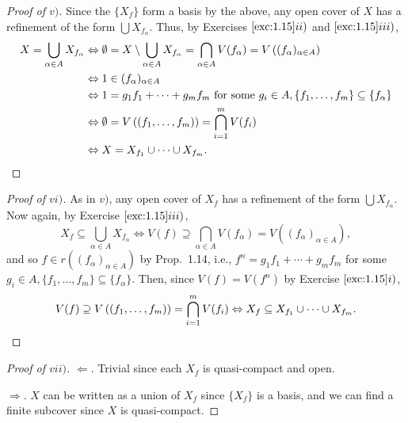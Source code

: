 \documentclass[12pt,letterpaper]{article}
\theoremstyle{definition}
\theoremstyle{remark}
\numberwithin{figure}{problem}
\numberwithin{equation}{section}
\begin{document}
\begin{proof}[Proof of $v)$]
  Since the $\{X_f\}$ form a basis by the above, any open cover of $X$ has a refinement of the form $\bigcup X_{f_\alpha}$. Thus, by Exercises $\ref{exc:1.15}ii)$ and $\ref{exc:1.15}iii)$,
  \begin{align*}
    X = \bigcup_{\alpha \in A} X_{f_\alpha} &\Leftrightarrow \emptyset = X \setminus \bigcup_{\alpha \in A} X_{f_\alpha} = \bigcap_{\alpha \in A} V(f_\alpha) = V\left( (f_\alpha)_{\alpha\in A} \right)\\
    &\Leftrightarrow 1 \in (f_\alpha)_{\alpha \in A}\\
    &\Leftrightarrow 1 = g_1f_1 + \cdots + g_mf_m\ \text{for some}\ g_i \in A, \{f_1,\ldots,f_m\} \subseteq \{f_\alpha\}\\
    &\Leftrightarrow \emptyset = V\left( (f_1,\ldots,f_{m}) \right) = \bigcap_{i=1}^m V(f_i)\\
    &\Leftrightarrow X = X_{f_1} \cup \cdots \cup X_{f_m}.\qedhere
  \end{align*}
\end{proof}
\begin{proof}[Proof of $vi)$]
  As in $v)$, any open cover of $X_f$ has a refinement of the form $\bigcup X_{f_\alpha}$. Now again, by Exercise $\ref{exc:1.15}iii)$,
  \begin{equation*}
    X_f \subseteq \bigcup_{\alpha \in A} X_{f_\alpha} \Leftrightarrow V(f) \supseteq \bigcap_{\alpha \in A} V(f_\alpha) = V\left( (f_\alpha)_{\alpha \in A} \right),
  \end{equation*}
  and so $f \in r\left( (f_\alpha)_{\alpha \in A} \right)$ by Prop.~1.14, i.e., $f^n = g_1f_1 + \cdots + g_mf_m$ for some $g_i \in A, \{f_1,\ldots,f_m\} \subseteq \{f_\alpha\}$. Then, since $V(f) = V(f^n)$ by Exercise $\ref{exc:1.15}i)$,
  \begin{equation*}
    V(f) \supseteq V\left( (f_1,\ldots,f_m) \right) = \bigcap_{i=1}^m V(f_i) \Leftrightarrow X_f \subseteq X_{f_1} \cup \cdots \cup X_{f_m}.\qedhere
  \end{equation*}
\end{proof}
\begin{proof}[Proof of $vii)$]
  $\Leftarrow$. Trivial since each $X_f$ is quasi-compact and open.
  \par $\Rightarrow$. $X$ can be written as a union of $X_f$ since $\{X_f\}$ is a basis, and we can find a finite subcover since $X$ is quasi-compact.
\end{proof}
\end{document}
